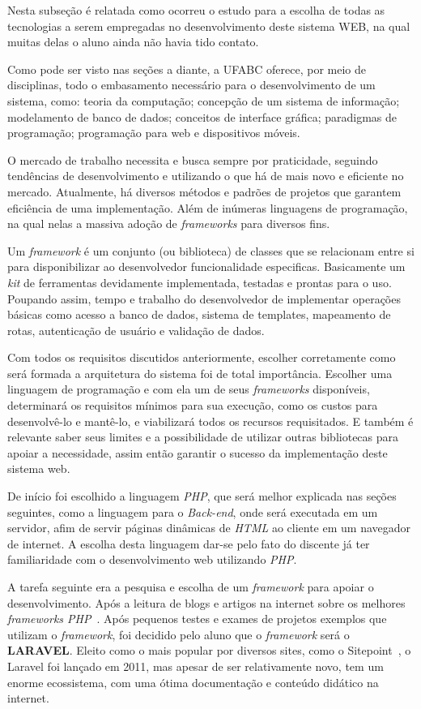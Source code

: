 \documentclass[
  12pt,            %
  openany,
  oneside,
  a4paper,         %
  english,      %
  brazil
]{article}
\numberwithin{figure}{section}
\numberwithin{table}{section}
\begin{document}
Nesta subseção é relatada como ocorreu o estudo para a escolha de todas as tecnologias a serem empregadas no desenvolvimento deste sistema WEB, na qual muitas delas o aluno ainda não havia tido contato.

Como pode ser visto nas seções a diante, a UFABC oferece, por meio de disciplinas, todo o embasamento necessário para o desenvolvimento de um sistema, como: teoria da computação; concepção de um sistema de informação; modelamento de banco de dados; conceitos de interface gráfica; paradigmas de programação; programação para web e dispositivos móveis.

O mercado de trabalho necessita e busca sempre por praticidade, seguindo tendências de desenvolvimento e utilizando o que há de mais novo e eficiente no mercado. Atualmente, há diversos métodos e padrões de projetos que garantem eficiência de uma implementação. Além de inúmeras linguagens de programação, na qual nelas a massiva adoção de \textit{frameworks} para diversos fins.

Um \textit{framework} é um conjunto (ou biblioteca) de classes que se relacionam entre si para disponibilizar ao desenvolvedor funcionalidade especificas. Basicamente um \textit{kit} de ferramentas devidamente implementada, testadas e prontas para o uso. Poupando assim, tempo e trabalho do desenvolvedor de implementar operações básicas como acesso a banco de dados, sistema de templates, mapeamento de rotas, autenticação de usuário e validação de dados.

Com todos os requisitos discutidos anteriormente, escolher corretamente como será formada a arquitetura do sistema foi de total importância. Escolher uma linguagem de programação e com ela um de seus \textit{frameworks} disponíveis, determinará os requisitos mínimos para sua execução, como os custos para desenvolvê-lo e mantê-lo, e viabilizará todos os recursos requisitados. E também é relevante saber seus limites e a possibilidade de utilizar outras bibliotecas para apoiar a necessidade, assim então garantir o sucesso da implementação deste sistema web.

De início foi escolhido a linguagem \textit{PHP}, que será melhor explicada nas seções seguintes, como a linguagem para o \textit{Back-end}, onde será executada em um servidor, afim de servir páginas dinâmicas de \textit{HTML} ao cliente em um navegador de internet. A escolha desta linguagem dar-se pelo fato do discente já ter familiaridade com o desenvolvimento web utilizando \textit{PHP}.

A tarefa seguinte era a pesquisa e escolha de um \textit{framework} para apoiar o desenvolvimento. Após a leitura de blogs e artigos na internet sobre os melhores \textit{frameworks PHP}~\cite{top10}. Após pequenos testes e exames de projetos exemplos que utilizam o \textit{framework}, foi decidido pelo aluno que o \textit{framework} será o \textbf{LARAVEL}. Eleito como o mais popular por diversos sites, como o Sitepoint~\cite{sitepoint}, o Laravel foi lançado em 2011, mas apesar de ser relativamente novo, tem um enorme ecossistema, com uma ótima documentação e conteúdo didático na internet.
\end{document}
